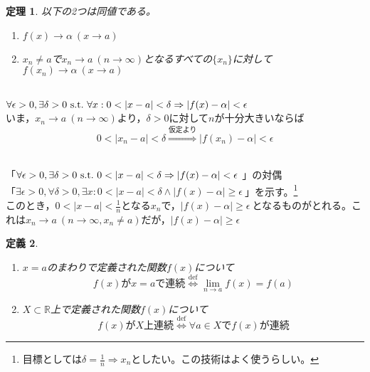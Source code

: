 \documentclass[dvipdfmx,a4j,10pt]{jsarticle}
\makeatletter
\theoremstyle{mystyle1}
\newtheorem{dfn}{定義}[part]
\newtheorem{thm}[dfn]{定理}
\theoremstyle{mystyle2}
\renewenvironment{proof}[1][\proofname]{\par
  \pushQED{\qed}%
  \normalfont
  \topsep6\p@\@plus6\p@ \trivlist
  \item[\hskip\labelsep{\bfseries\sffamily #1}]\ignorespaces
}{%
  \popQED\endtrivlist\@endpefalse
}
\renewcommand\proofname{証明}
\newcommand{\defLeftrightarrow}{\overset{\text{def}}{\iff}}
\makeatother
\begin{document}
\begin{framed}
    \begin{thm}\label{th5.2}
        以下の2つは同値である。
        \begin{enumerate}
        \item $f(x)\to\alpha\ (x\to a)$
        \item $x_n\neq a$で$x_n\to a\ (n\to\infty)$となるすべての$\{x_n\}$に対して$f(x_n)\to\alpha\ (x\to a)$
        \end{enumerate}
    \end{thm}
\end{framed}

\begin{proof}[定理\ref{th5.2}の証明]\
    \\
    $\forall\epsilon>0,\exists\delta>0\ {\rm s.t.}\ \forall x:0<|x-a|<\delta \Rightarrow |f(x)-\alpha|<\epsilon\ $\\
    いま，$x_n\to a\ (n\to\infty)$より，$\delta>0$に対して$n$が十分大きいならば
    \[0<|x_n-a|<\delta \overset{仮定より}{\Rightarrow} |f(x_n)-\alpha|<\epsilon\]

    \\
    「$\forall\epsilon>0,\exists\delta>0\ {\rm s.t.}\ 0<|x-a|<\delta \Rightarrow |f(x)-\alpha|<\epsilon\ $」の対偶\\
    「$\exists\epsilon>0,\forall\delta>0,\exists x:0<|x-a|<\delta \land |f(x)-\alpha|\geq\epsilon\ $」を示す。\footnote{目標としては$\delta=\frac{1}{n}\Rightarrow x_n$としたい。この技術はよく使うらしい。}
    \\
    このとき，$0<|x-a|<\frac{1}{n}$となる$x_n$で，$|f(x)-\alpha|\geq\epsilon\ $となるものがとれる。これは$x_n\to a\ (n\to\infty,x_n\neq a)$だが，$|f(x)-\alpha|\geq\epsilon$
\end{proof}

\newpage

\begin{framed}
    \begin{dfn}\label{def5.3}　
        \begin{enumerate}
            \item $x=a$のまわりで定義された関数$f(x)$について
            \[f(x)がx=aで連続 \defLeftrightarrow \lim_{n\to a}f(x)=f(a)\]
            \item $X\subset \mathbb{R}$上で定義された関数$f(x)$について
            \[f(x)がX上連続 \defLeftrightarrow \forall a\in Xでf(x)が連続\]
        \end{enumerate}
    \end{dfn}
\end{framed}
\end{document}
